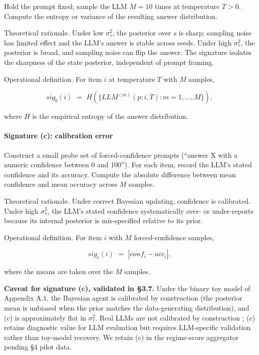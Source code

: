 \documentclass{article}
\begin{document}
Hold the prompt fixed; sample the LLM \(M = 10\) times at temperature
\(T > 0\). Compute the entropy or variance of the resulting answer
distribution.

Theoretical rationale. Under low \(\sigma_{\tau}^{2}\), the posterior
over \(s\) is sharp; sampling noise has limited effect and the LLM's
answer is stable across seeds. Under high \(\sigma_{\tau}^{2}\), the
posterior is broad, and sampling noise can flip the answer. The
signature isolates the sharpness of the state posterior, independent of
prompt framing.

Operational definition. For item \(i\) at temperature \(T\) with \(M\)
samples,

\[{sig}_{b}(i)\mspace{6mu} = \mspace{6mu} H\left( \{{LLM}^{(m)}(p;i,T):m = 1,\ldots,M\} \right),\]

where \(H\) is the empirical entropy of the answer distribution.

\paragraph{Signature (c): calibration
error}\label{signature-c-calibration-error}

Construct a small probe set of forced-confidence prompts (``answer X
with a numeric confidence between 0 and 100''). For each item, record
the LLM's stated confidence and its accuracy. Compute the absolute
difference between mean confidence and mean accuracy across \(M\)
samples.

Theoretical rationale. Under correct Bayesian updating, confidence is
calibrated. Under high \(\sigma_{\tau}^{2}\), the LLM's stated
confidence systematically over- or under-reports because its internal
posterior is mis-specified relative to its prior.

Operational definition. For item \(i\) with \(M\) forced-confidence
samples,

\[{sig}_{c}(i)\mspace{6mu} = \mspace{6mu}|{\overline{conf}}_{i} - {\overline{acc}}_{i}|,\]

where the means are taken over the \(M\) samples.

\textbf{Caveat for signature (c), validated in \S{}3.7.} Under the binary
toy model of Appendix A.1, the Bayesian agent is calibrated by
construction (the posterior mean is unbiased when the prior matches the
data-generating distribution), and (c) is approximately flat in
\(\sigma_{\tau}^{2}\). Real LLMs are not calibrated by construction
\cite{desai2020, jiang2021}; (c) retains diagnostic value
for LLM evaluation but requires LLM-specific validation rather than
toy-model recovery. We retain (c) in the regime-score aggregator pending
\S{}4 pilot data.
\end{document}
